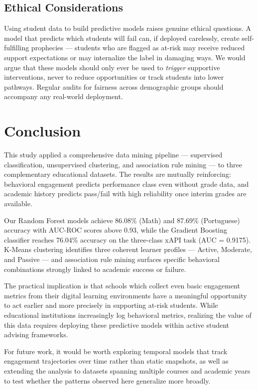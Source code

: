 \documentclass[conference]{IEEEtran}
\begin{document}
\subsection{Ethical Considerations}

Using student data to build predictive models raises genuine ethical questions. A model that predicts which students will fail can, if deployed carelessly, create self-fulfilling prophecies — students who are flagged as at-risk may receive reduced support expectations or may internalize the label in damaging ways. We would argue that these models should only ever be used to \textit{trigger} supportive interventions, never to reduce opportunities or track students into lower pathways. Regular audits for fairness across demographic groups should accompany any real-world deployment.

\section{Conclusion}

This study applied a comprehensive data mining pipeline — supervised classification, unsupervised clustering, and association rule mining — to three complementary educational datasets. The results are mutually reinforcing: behavioral engagement predicts performance class even without grade data, and academic history predicts pass/fail with high reliability once interim grades are available.

Our Random Forest models achieve 86.08\% (Math) and 87.69\% (Portuguese) accuracy with AUC-ROC scores above 0.93, while the Gradient Boosting classifier reaches 76.04\% accuracy on the three-class xAPI task (AUC = 0.9175). K-Means clustering identifies three coherent learner profiles — Active, Moderate, and Passive — and association rule mining surfaces specific behavioral combinations strongly linked to academic success or failure.

The practical implication is that schools which collect even basic engagement metrics from their digital learning environments have a meaningful opportunity to act earlier and more precisely in supporting at-risk students. While educational institutions increasingly log behavioral metrics, realizing the value of this data requires deploying these predictive models within active student advising frameworks.

For future work, it would be worth exploring temporal models that track engagement trajectories over time rather than static snapshots, as well as extending the analysis to datasets spanning multiple courses and academic years to test whether the patterns observed here generalize more broadly.
\end{document}
